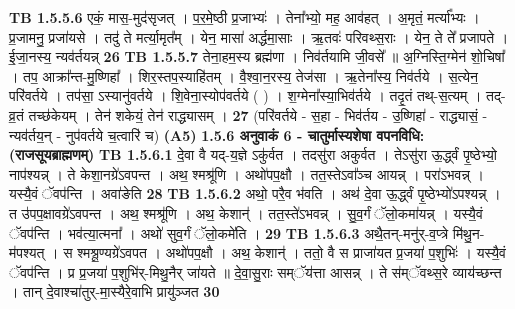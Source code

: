 \documentclass[17pt]{extarticle}
\begin{document}
                  \newline
                                \textbf{ TB 1.5.5.6} \newline
                  एकं॒ मास॒-मुद॑सृजत् । प॒र॒मे॒ष्ठी प्र॒जाभ्यः॑ । तेना᳚भ्यो॒ मह॒ आव॑हत् । अ॒मृतं॒ मर्त्या᳚भ्यः । प्र॒जामनु॒ प्रजा॑यसे । तदु॑ ते मर्त्या॒मृत᳚म् । येन॒ मासा॑ अर्द्धमा॒साः । ऋ॒तवः॑ परिवथ्स॒राः । येन॒ ते ते᳚ प्रजापते । ई॒जा॒नस्य॒ न्यव॑र्तयन्न् \textbf{ 26} \newline
                  \newline
                                \textbf{ TB 1.5.5.7} \newline
                  तेना॒हम॒स्य ब्रह्म॑णा । निव॑र्तयामि जी॒वसे᳚ ॥ अ॒ग्निस्ति॒ग्मेन॑ शो॒चिषा᳚ । तप॒ आक्रा᳚न्त-मु॒ष्णिहा᳚ । शिर॒स्तप॒स्याहि॑तम् । वै॒श्वा॒न॒रस्य॒ तेज॑सा । ऋ॒तेना᳚स्य॒ निव॑र्तये । स॒त्येन॒ परि॑वर्तये । तप॑सा॒ ऽस्यानु॑वर्तये । शि॒वेना॒स्योप॑वर्तये ( ) । श॒ग्मेना᳚स्या॒भिव॑र्तये । तदृ॒तं तथ्-स॒त्यम् । तद्-व्र॒तं तच्छ॑केयम् । तेन॑ शकेयं॒ तेन॑ राद्ध्यासम् । \textbf{ 27} \newline
                  \newline
                                    (परि॑वर्तये - स॒हा - भिव॑र्तय - उ॒ष्णिहा॑ - राद्ध्यासं॒ - न्यव॑र्तय॒न् - नुप॑वर्तये च॒त्वारि॑ च) \textbf{(A5)} \newline \newline
                \textbf{ 1.5.6     अनुवाकं   6 - चातुर्मास्यशेषा वपनविधि: (राजसूयब्राह्मणम्)} \newline
                                \textbf{ TB 1.5.6.1} \newline
                  दे॒वा वै यद्-य॒ज्ञे ऽकु॑र्वत । तदसु॑रा अकुर्वत । तेऽसु॑रा ऊ॒र्द्ध्वं पृ॒ष्ठेभ्यो॒ नाप॑श्यन्न् । ते केशा॒नग्रे॑ऽवपन्त । अथ॒ श्मश्रू॑णि । अथो॑पप॒क्षौ । तत॒स्तेऽवा᳚ञ्च आयन्न् । परा॑ऽभवन्न् । यस्यै॒वं ॅवप॑न्ति । अवा॑ङेति \textbf{ 28} \newline
                  \newline
                                \textbf{ TB 1.5.6.2} \newline
                  अथो॒ परै॒व भ॑वति । अथ॑ दे॒वा ऊ॒र्द्ध्वं पृ॒ष्ठेभ्यो॑ऽपश्यन्न् । त उ॑पप॒क्षावग्रे॑ऽवपन्त । अथ॒ श्मश्रू॑णि । अथ॒ केशान्॑ । तत॒स्ते॑ऽभवन्न् । सु॒व॒र्गं ॅलो॒कमा॑यन्न् । यस्यै॒वं ॅवप॑न्ति । भव॑त्या॒त्मना᳚ । अथो॑ सुव॒र्गं ॅलो॒कमे॑ति । \textbf{ 29} \newline
                  \newline
                                \textbf{ TB 1.5.6.3} \newline
                  अथै॒तन्-मनु॑र्-व॒प्त्रे मि॑थु॒न-म॑पश्यत् । स श्मश्रू॒ण्यग्रे॑ऽवपत । अथो॑पप॒क्षौ । अथ॒ केशान्॑ । ततो॒ वै स प्राजा॑यत प्र॒जया॑ प॒शुभिः॑ । यस्यै॒वं ॅवप॑न्ति । प्र प्र॒जया॑ प॒शुभि॑र्-मिथु॒नैर् जा॑यते ॥ दे॒वा॒सु॒राः सम्ॅय॑त्ता आसन्न् । ते स॑म्ॅवथ्स॒रे व्याय॑च्छन्त । तान् दे॒वाश्चा॑तुर्-मा॒स्यैरे॒वाभि प्रायु॑ञ्जत \textbf{ 30} \newline
\end{document}
